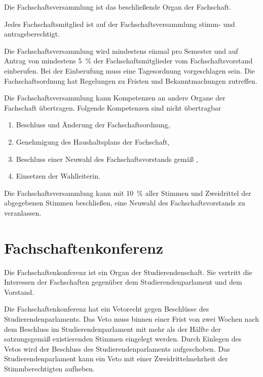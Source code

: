 \label{fachschaft:vv}

Die Fachschaftsversammlung ist das beschließende Organ der Fachschaft.

Jedes Fachschaftsmitglied ist auf der Fachschaftsversammlung stimm- und antragsberechtigt.

Die Fachschaftsversammlung wird mindestens einmal pro Semester und auf Antrag von mindestens 5~\% der Fach\-schaftsmitglieder vom Fachschaftsvorstand einberufen. Bei der Einberufung muss eine Tagesordnung vorgeschlagen sein. Die Fachschaftsordnung hat Regelungen zu Fristen und Bekanntmachungen zutreffen.

Die Fachschaftsversammlung kann Kompetenzen an andere Organe der Fachschaft übertragen. Folgende Kompetenzen sind nicht übertragbar \label{fachschaft:vv:kompetenzen}
  \begin{enumerate}
  \item Beschluss und Änderung der Fachschaftsordnung,
  \item Genehmigung des Haushaltsplans der Fachschaft,
  \item Beschluss einer Neuwahl des Fachschaftsvorstands gemäß , \label{fachschaft:vv:kompetenzen:abwahl}
  \item Einsetzen der Wahlleiterin.\label{fachschaft:vv:wahlleiter}
  \end{enumerate}

Die Fachschaftsversammlung kann mit 10~\% aller Stimmen und Zweidrittel der abgegebenen Stimmen be\-schlie\-ßen, eine Neuwahl des Fach\-schaftsvor\-stands zu veranlassen\label{fachschaft:vv:wahl}.

%
%

\parnumberfalse \section{Fachschaftenkonferenz}\label{fsk}  \parnumbertrue

 \label{fsk:aufgaben}

Die Fachschaftenkonferenz ist ein Organ der Studierendenschaft. Sie vertritt die Interessen der Fachschaften  gegenüber dem Studierendenparlament und dem Vorstand.

Die Fachschaftenkonferenz hat ein Vetorecht gegen Beschlüsse des Studierendenparlaments. Das Veto muss binnen einer Frist von zwei Wochen nach dem Beschluss im Studierendenparlament mit mehr als der Hälfte der satzungsgemäß existierenden Stimmen eingelegt werden. Durch Einlegen des Vetos wird der Beschluss des Studierendenparlaments aufgeschoben. Das Studierendenparlament kann ein Veto mit einer Zweidrittelmehrheit der Stimmberechtigten aufheben.\label{fsk:aufgaben:einspruch}

